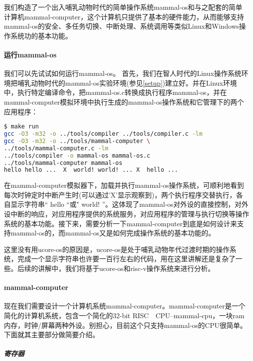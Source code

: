 我们构造了一个出入哺乳动物时代的简单操作系统mammal-os和与之配套的简单计算机mammal-computer，这个计算机只提供了基本的硬件能力，从而能够支持mammal-os的安全、多任务切换、中断处理、系统调用等类似Linux和Windows操作系统功的基本功能。

\paragraph{运行mammal-os}
我们可以先试试如何运行mammal-os。 首先，我们在智人时代的Linux操作系统环境把哺乳动物时代的mammal-os实验环境(参见\ref{setup})建立好。并在Linux环境中，执行特定编译命令，把mammal-os.c转换成执行程序mammal-os，并在mammal-computer模拟环境中执行生成的mammal-os操作系统和它管理下的两个应用程序：
\begin{lstlisting}[language={bash}]
$ make run
gcc -O3 -m32 -o ../tools/compiler ../tools/compiler.c -lm
gcc -O3 -m32 -o ../tools/mammal-computer \
../tools/mammal-computer.c -lm
../tools/compiler -o mammal-os mammal-os.c
../tools/mammal-computer mammal-os
hello hello ...  X  world! world! ... X  hello ...
\end{lstlisting}

在mammal-computer模拟器下，加载并执行mammal-os操作系统，可顺利地看到每次时钟定时中断产生时(可以通过'X'显示观察到)，两个执行程序交替执行，各自显示字符串“ hello “或" world! ”。这体现了mammal-os对外设的直接控制，对外设中断的响应，对应用程序提供的系统服务，对应用程序的管理与执行切换等操作系统的基本功能。接下来，需要分析一下mammal-computer到底是如何设计来支持mammal-os的，而mammal-os又是如何完成操作系统的基本功能的。

\begin{note} 
	这里没有用ucore-os的原因是，ucore-os是处于哺乳动物年代过渡时期的操作系统，完成一个显示字符串也许要一百行左右的代码，用在这里讲解还是复杂了一些。后续的讲解中，我们将基于ucore-os和risc-v操作系统来进行分析。
\end{note} 

\paragraph{mammal-computer}
现在我们需要设计一个计算机系统mammal-computer。mammal-computer是一个简化的计算机系统，包含一个简化的32-bit RISC　CPU--mammal-cpu，一块ram内存，时钟/屏幕两种外设。别担心，目前这个只支持mammal-os的CPU很简单。下面就其主要部分做简要介绍。

\subparagraph{寄存器}


